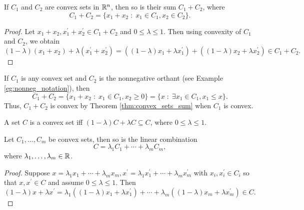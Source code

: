 \documentclass[11pt,a4paper]{article}
\begin{document}
\begin{theorem}\label{thm:convex_sets_sum}
    If $C_1$ and $C_2$ are convex sets in $\mathbb{R}^n$, then so is their sum $C_1+C_2$, where 
    \begin{equation*}
        C_1+C_2 = \{x_1+x_2\;:\;x_1\in C_1,x_2\in C_2\}.
    \end{equation*}
\end{theorem}

\begin{proof}
    Let $x_1+x_2,x_1^\prime +x_2^\prime \in C_1+C_2$ and $0\le \lambda\le 1$. Then using convexity of $C_1$ and $C_2$, we obtain
    \begin{equation*}
        (1-\lambda) (x_1+x_2) + \lambda (x_1^\prime +x_2^\prime) = ((1-\lambda)x_1 + \lambda x_1^\prime) + ((1-\lambda)x_2 + \lambda x_2^\prime) \in C_1+C_2.
    \end{equation*}
\end{proof}

\begin{example}
    If $C_1$ is any convex set and $C_2$ is the nonnegative orthant (see Example \ref{eg:nonneg_notation}), then 
    \begin{equation*}
        C_1+C_2 = \{x_1+x_2\;:\; x_1\in C_1,x_2\ge 0\} = \{x\;:\;\exists x_1\in C_1,x_1\le x\}.
    \end{equation*}
    Thus, $C_1+C_2$ is convex by Theorem \ref{thm:convex_sets_sum} when $C_1$ is convex.
\end{example}

\begin{theorem}\label{thm:convex_set_eq_def_1}
    A set $C$ is a convex set iff $(1-\lambda) C+ \lambda C\subseteq C$, where $0\le\lambda\le 1$.
\end{theorem}

\begin{proposition}
    Let $C_1,\ldots,C_m$ be convex sets, then so is the linear combination
    \begin{equation*}
        C = \lambda_1 C_1 + \cdots + \lambda_m C_m,
    \end{equation*}
    where $\lambda_1,\ldots, \lambda_m\in \mathbb{R}$.
\end{proposition}

\begin{proof}
    Suppose $x = \lambda_1 x_1+\cdots +\lambda_m x_m, x^\prime = \lambda_1 x_1^\prime+\cdots +\lambda_m x_m^\prime$ with $x_i,x_i^\prime\in C_i$ so that $x,x^\prime \in C$ and assume $0\le \lambda\le 1$. Then
    \begin{equation*}
        (1-\lambda) x + \lambda x^\prime = \lambda_1 ((1-\lambda) x_1 + \lambda x_1^\prime) + \cdots + \lambda_m ((1-\lambda) x_m + \lambda x_m^\prime) \in C.
    \end{equation*}
\end{proof}
\end{document}
